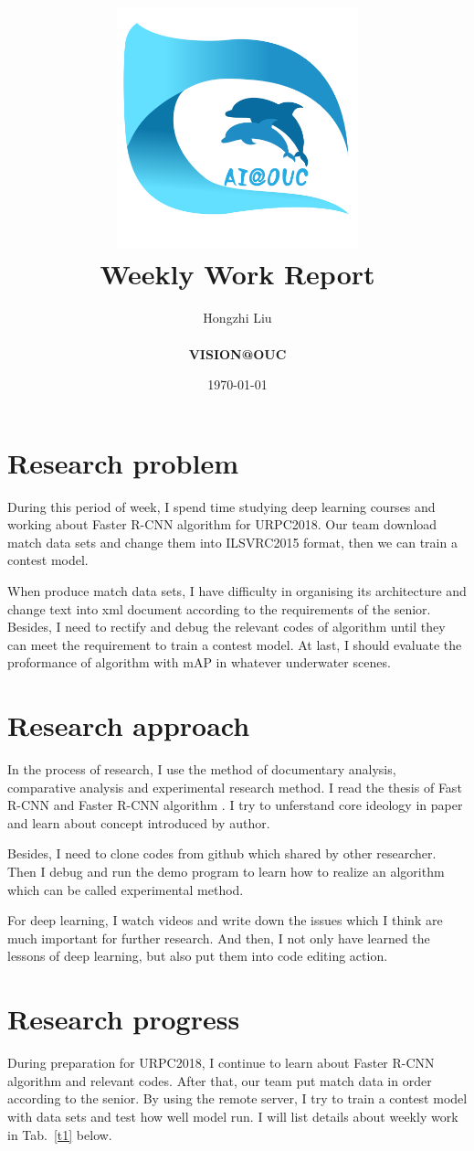 \documentclass[a4paper]{article}
\title{
    \vspace*{1in}
    \includegraphics[width=2.75in]{figures/zhenglab-logo} \\
    \vspace*{1.2in}
    \textbf{\huge Weekly Work Report}
    \vspace{0.2in}
}
\author{Hongzhi Liu \\
    \vspace*{0.5in} \\
    \textbf{VISION@OUC} \\
    \vspace*{1in}
}
\date{\today}
\begin{document}
\par
\maketitle
\setcounter{page}{0}
\thispagestyle{empty}
\newpage


\section{Research problem}

During this period of week, I spend time studying deep learning courses and working about Faster R-CNN algorithm for URPC2018. Our team download match data sets and change them into ILSVRC2015 format, then we can train a contest model. 

When produce match data sets, I have difficulty in organising its architecture and change text into xml document according to the requirements of the senior. Besides, I need to rectify and debug the relevant codes of algorithm until they can meet the requirement to train a contest model. At last, I should evaluate the proformance of algorithm with mAP in whatever underwater scenes.

\section{Research approach}

In the process of research, I use the method of documentary analysis, comparative analysis and experimental research method. I read the thesis of Fast R-CNN \cite{Girshick2015Fast} and Faster R-CNN algorithm \cite{Ren2015Faster}. I try to unferstand core ideology in paper and learn about concept introduced by author.

Besides, I need to clone codes from github which shared by other researcher. Then I debug and run the demo program to learn how to realize an algorithm which can be called experimental method. 

For deep learning, I watch videos and write down the issues which I think are much important for further research. And then, I not only have learned the lessons of deep learning, but also put them into code editing action. 


\section{Research progress}

During preparation for URPC2018, I continue to learn about Faster R-CNN algorithm \cite{Ren2015Faster} and relevant codes. After that, our team put match data in order according to the senior. By using the remote server, I try to train a contest model with data sets and test how well model run. I will list details about weekly work in Tab.~\ref{t1} below. 
\end{document}
